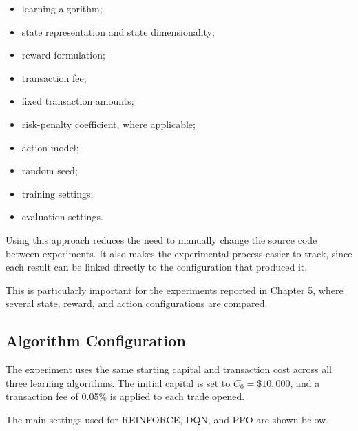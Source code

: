 \begin{itemize}
\item
  learning algorithm;
\item
  state representation and state dimensionality;
\item
  reward formulation;
\item
  transaction fee;
\item
  fixed transaction amounts;
\item
  risk-penalty coefficient, where applicable;
\item
  action model;
\item
  random seed;
\item
  training settings;
\item
  evaluation settings.
\end{itemize}

Using this approach reduces the need to manually change the source code
between experiments. It also makes the experimental process easier to
track, since each result can be linked directly to the configuration
that produced it.

This is particularly important for the experiments reported in Chapter
5, where several state, reward, and action configurations are compared.

\subsection{Algorithm Configuration}

The experiment uses the same starting capital and transaction cost
across all three learning algorithms. The initial capital is set to
\(C_{0} = \$ 10,000\), and a transaction fee of 0.05\% is applied to
each trade opened.

The main settings used for REINFORCE, DQN, and PPO are shown below.

